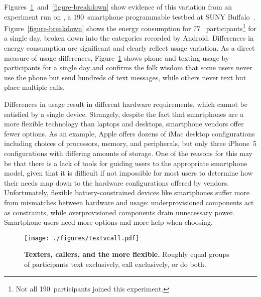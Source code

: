 \clearpage

Figures~\ref{figure-textvcall}~and~\ref{figure-breakdown} show evidence of
this variation from an experiment run on \PhoneLab{}, a 190~smartphone
programmable testbed at SUNY Buffalo~\cite{phonelab-web}.
Figure~\ref{figure-breakdown} shows the energy consumption for 77~\PhoneLab{}
participants\footnote{Not all 190~participants joined this experiment.} for a
single day, broken down into the categories recorded by Android. Differences
in energy consumption are significant and clearly reflect usage variation. As
a direct measure of usage differences, Figure~\ref{figure-textvcall} shows
phone and texting usage by participants for a single day and confirms the
folk wisdom that some users never use the phone but send hundreds of text
messages, while others never text but place multiple calls.

Differences in usage result in different hardware requirements, which cannot
be satisfied by a single device. Strangely, despite the fact that smartphones
are a more flexible technology than laptops and desktops, smartphone vendors
offer fewer options. As an example, Apple offers dozens of iMac desktop
configurations including choices of processors, memory, and peripherals, but
only three iPhone~5 configurations with differing amounts of storage. One of
the reasons for this may be that there is a lack of tools for guiding users
to the appropriate smartphone model, given that it is difficult if not
impossible for most users to determine how their needs map down to the
hardware configurations offered by vendors. Unfortunately, flexible
battery-constrained devices like smartphones suffer more from mismatches
between hardware and usage: underprovisioned components act as constraints,
while overprovisioned components drain unnecessary power. Smartphone users
need more options and more help when choosing.

\begin{figure}[t]
\texttt{[image: ./figures/textvcall.pdf]}

\caption{\textbf{Texters, callers, and the more flexible.} Roughly equal
groups of \PhoneLab{} participants text exclusively, call exclusively, or do
both.}

\label{figure-textvcall}
\end{figure}
